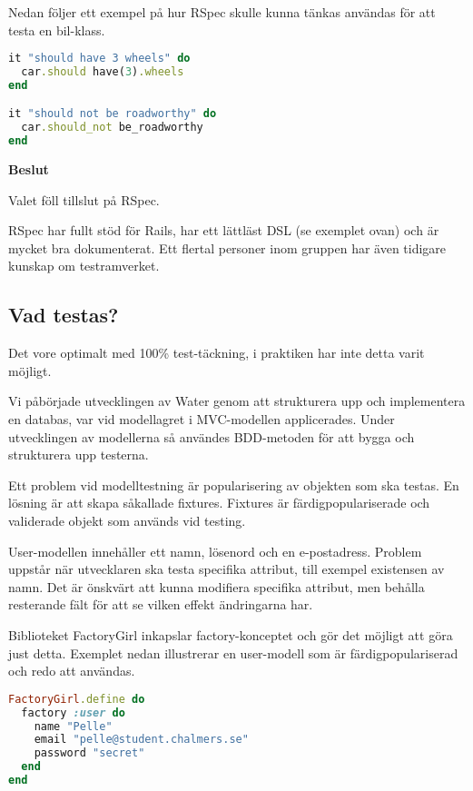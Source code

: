 Nedan följer ett exempel på hur RSpec skulle kunna tänkas användas för att testa en bil-klass.

\begin{lstlisting}[language=Ruby, showstringspaces=false]
it "should have 3 wheels" do
  car.should have(3).wheels
end

it "should not be roadworthy" do
  car.should_not be_roadworthy
end
\end{lstlisting}

\begin{flushright}
  
  \textbf{Beslut}
  
    Valet föll tillslut på RSpec.

    RSpec har fullt stöd för Rails, har ett lättläst DSL (se exemplet ovan) och är mycket bra dokumenterat. Ett flertal personer inom gruppen har även tidigare kunskap om testramverket.
\end{flushright}

\subsection{Vad testas?}
Det vore optimalt med 100\% test-täckning, i praktiken har inte detta varit möjligt.

Vi påbörjade utvecklingen av Water genom att strukturera upp och implementera en databas, var vid modellagret i MVC-modellen applicerades. Under utvecklingen av modellerna så användes BDD-metoden för att bygga och strukturera upp testerna. 

Ett problem vid modelltestning är popularisering av objekten som ska testas. En lösning är att skapa såkallade fixtures. Fixtures är färdigpopulariserade och validerade objekt som används vid testing.

User-modellen innehåller ett namn, lösenord och en e-postadress. Problem uppstår när utvecklaren ska testa specifika attribut, till exempel existensen av namn. Det är önskvärt att kunna modifiera specifika attribut, men behålla resterande fält för att se vilken effekt ändringarna har.

Biblioteket FactoryGirl inkapslar factory-konceptet och gör det möjligt att göra just detta. Exemplet nedan illustrerar en user-modell som är färdigpopulariserad och redo att användas.

\begin{lstlisting}[language=Ruby]
FactoryGirl.define do
  factory :user do
    name "Pelle"
    email "pelle@student.chalmers.se"
    password "secret"
  end
end
\end{lstlisting}

